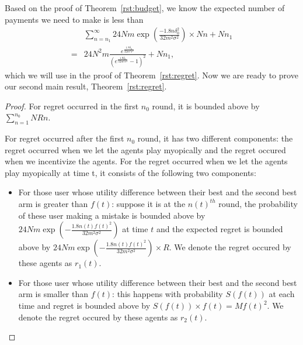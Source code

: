 \documentclass{article}
\begin{document}
Based on the proof of Theorem~\ref{rst:budget}, we know the expected number of payments we need to make is less than
\begin{align}
&\sum_{n=n_{1}}^{\infty}24Nm \exp\left(\frac{-1.8 n\delta_{0}^2}{32m^2\sigma^2}\right)\times Nn+Nn_{1} \nonumber \\
=&24N^2 m \frac{e^{\frac{1.8\delta_{0}}{32m^2\sigma^2}}}{(e^{\frac{1.8\delta_{0}}{32m^2\sigma^2}}-1)^2} + Nn_1, \nonumber
\end{align}
which we will use in the proof of Theorem~\ref{rst:regret}. Now we are ready to prove our second main result, Theorem~\ref{rst:regret}.

\begin{proof}
For regret occurred in the first $n_0$ round, it is bounded above by $\sum_{n=1}^{n_{0}}NRn$.

For regret occurred after the first $n_0$ round, it has two different components: the regret occurred when we let the agents play myopically and the regret occured when we incentivize the agents. For the regret occurred when we let the agents play myopically at time t, it consists of the following two components:
\begin{itemize}
\item For those user whose utility difference between their best and the second best arm is greater than $f(t)$: suppose it is at the $n(t)^{th}$ round, the probability of these user making a mistake is bounded above by $24Nm\exp\left(-\frac{1.8n(t) f(t)^2}{32 m^2\sigma^2}\right)$ at time $t$ and the expected regret is bounded above by $24Nm\exp\left(-\frac{1.8n(t) f(t)^2}{32 m^2\sigma^2}\right)\times R$. We denote the regret occured by these agents as $r_1(t)$.
\item For those user whose utility difference between their best and the second best arm is smaller than $f(t)$: this happens with probability $S(f(t))$ at each time and regret is bounded above by $S(f(t)) \times f(t)=Mf(t)^2$. We denote the regret occured by these agents as $r_2(t)$.
\end{itemize}


\end{proof}
\end{document}
